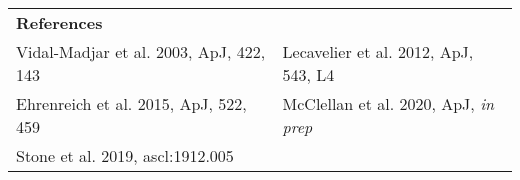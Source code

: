 \documentclass[11pt]{article}
\begin{document}
\vspace{0.45cm}
\begin{adjustbox}{}
\begin{tabular}{p{}l}
    \textbf{References} \\
     Vidal-Madjar et al. 2003, ApJ, 422, 143 &
     Lecavelier et al. 2012, ApJ, 543, L4 \\
     Ehrenreich et al. 2015, ApJ, 522, 459 &
     McClellan et al. 2020, ApJ, \textit{in prep}\\
    Stone et al. 2019, ascl:1912.005
\end{tabular}
\end{adjustbox}

%
%
\end{document}
